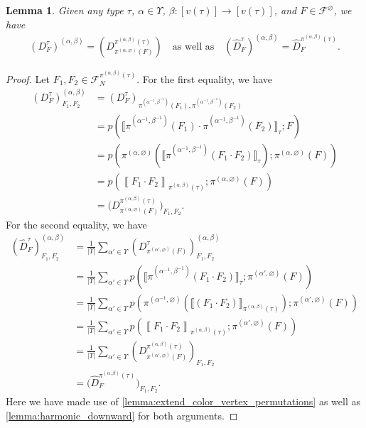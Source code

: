 \documentclass[a4paper,11pt]{article}
\newtheorem{lemma}[theorem]{Lemma}
\numberwithin{equation}{section}
\newcommand{\mF}{\mathcal{F}}
\begin{document}
\begin{lemma}\label{lem:averaged_are_invariant}
    Given any type $\tau$, $\alpha \in \Upsilon$, $\beta: [v(\tau)] \to [v(\tau)]$, and $F \in \mF^\varnothing$, we have
    \begin{align*}
        (D_F^\tau)^{(\alpha,\beta)} = (D_{\pi^{(\alpha,\varnothing)}(F)}^{\pi^{(\alpha,\beta)}(\tau)}) \quad \text{as well as} \quad (\hat D^\tau_{F})^{(\alpha,\beta)} = \hat D_F^{\pi^{(\alpha,\beta)}(\tau)}.
    \end{align*}
\end{lemma}
%
\begin{proof}
    Let $F_1, F_2 \in \mF^{\pi^{(\alpha,\beta)}(\tau)}_N$. For the first equality, we have
    \begin{align*}
        (D_F^\tau)^{(\alpha, \beta)}_{F_1,F_2} &=
        (D_F^\tau)_{\pi^{(\alpha^{-1}, \beta^{-1})} (F_1), \pi^{(\alpha^{-1}, \beta^{-1})} (F_2)} \\
        & = p \left( \big\llbracket \pi^{(\alpha^{-1}, \beta^{-1})} (F_1) \cdot \pi^{(\alpha^{-1}, \beta^{-1})}(F_2) \big\rrbracket_{\tau} ; F \right) \\
        & = p \left( \pi^{(\alpha, \varnothing)} \left( \big\llbracket \pi^{(\alpha^{-1}, \beta^{-1})} (F_1 \cdot F_2) \big\rrbracket_{\tau} \right); \pi^{(\alpha, \varnothing)} (F) \right) \\
        & = p(\left\llbracket F_1 \cdot F_2 \right\rrbracket_{\pi^{(\alpha, \beta)}(\tau)}; \pi^{(\alpha, \varnothing)} (F)) \\
        & = \big( D_{\pi^{(\alpha,\varnothing)}(F)}^{\pi^{(\alpha,\beta)}(\tau)} \big)_{F_1,F_2}.
    \end{align*}
    For the second equality, we have
    \begin{align*}
        (\hat D^\tau_{F})^{(\alpha,\beta)}_{F_1,F_2} 
        & = \frac{1}{|\Upsilon|}\sum_{\alpha' \in \Upsilon} \left( D^\tau_{\pi^{(\alpha',\varnothing)} (F)} \right)^{(\alpha, \beta)}_{F_1, F_2} \\
        & = \frac{1}{|\Upsilon|}\sum_{\alpha' \in \Upsilon} p(\llbracket \pi^{(\alpha^{-1}, \beta^{-1})}(F_1 \cdot F_2) \rrbracket_\tau; \pi^{(\alpha', \varnothing)}(F)) \\
        & = \frac{1}{|\Upsilon|}\sum_{\alpha' \in \Upsilon}  p(\pi^{(\alpha^{-1}, \varnothing)} (\llbracket (F_1 \cdot F_2) \rrbracket_{\pi^{(\alpha, \beta)} (\tau)} ); \pi^{(\alpha', \varnothing)}(F)) \\
        & = \frac{1}{|\Upsilon|}\sum_{\alpha' \in \Upsilon} p(\left\llbracket F_1 \cdot F_2 \right\rrbracket_{\pi^{(\alpha,\beta)}(\tau)}; \pi^{(\alpha', \varnothing)}(F)) \\
        & = \frac{1}{|\Upsilon|}\sum_{\alpha' \in \Upsilon} \left( D^{\pi^{(\alpha,\beta)}(\tau)}_{\pi^{(\alpha', \varnothing)}(F)} \right)_{F_1, F_2} \\
        & = \big( \hat D_F^{\pi^{(\alpha,\beta)}(\tau)} \big)_{F_1, F_2}.
    \end{align*}
    Here we have made use of \cref{lemma:extend_color_vertex_permutations} as well as \cref{lemma:harmonic_downward} for both arguments.
\end{proof}
\end{document}
